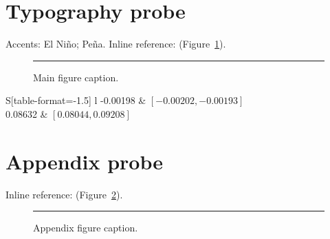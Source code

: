 \documentclass[APA,STIX1COL]{WileyNJD-v2}
\renewcommand{\thefigure}{\arabic{figure}}
\renewcommand{\thetable}{\arabic{table}}
\begin{document}
\section{Typography probe}
Accents: El Niño; Peña. Inline reference: (Figure~\ref{fig:probe}).
\begin{figure}[h]\centering\rule{80pt}{6pt}\caption{Main figure caption.}\label{fig:probe}\end{figure}
\begin{tabular}{S[table-format=-1.5] l}
-0.00198 & $[-0.00202,-0.00193]$\\
0.08632 & $[0.08044,0.09208]$
\end{tabular}
\appendix
\renewcommand{\thefigure}{\Alph{section}\arabic{figure}}
\renewcommand{\thetable}{\Alph{section}\arabic{table}}
\section{Appendix probe}
Inline reference: (Figure~\ref{fig:app}).
\begin{figure}[h]\centering\rule{80pt}{6pt}\caption{Appendix figure caption.}\label{fig:app}\end{figure}
\end{document}
